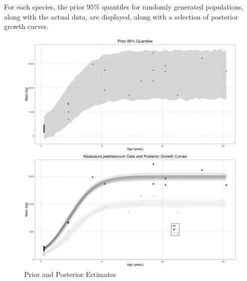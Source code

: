 \documentclass[letterpaper]{article}
\begin{document}
For each species, the prior 95\% quantiles for randomly generated populations, along with the actual data, are displayed, along with a selection of posterior growth curves.

\begin{figure}[H]
  \centering
  \begin{minipage}[b]{0.45\textwidth}
    \centering
    \includegraphics[width=\textwidth]{images/maiasauraPrior.png}
  \end{minipage}
  \begin{minipage}[b]{0.45\textwidth}
    \centering
    \includegraphics[width=\textwidth]{images/maiasauraPosterior.png}
  \end{minipage}
    \label{fig:maiasauraPriorPosterior}
    \caption{\maia{} Prior and Posterior Estimates}
\end{figure} 
\end{document}
